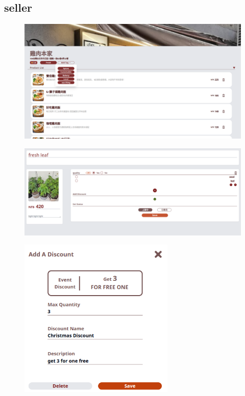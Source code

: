 \documentclass[a4paper, 12pt]{article}
\begin{document}
\subsection{seller}
\begin{figure}[hp]
    \centerline{\includegraphics[width=40em]{gui-snapshot/seller/store-edit.png}}
    \label{fig:enter-label}
\end{figure}
\newline
{}
\begin{figure}[hp]
    \centerline{\includegraphics[width=40em]{gui-snapshot/seller/item.png}}
    \label{fig:enter-label}
\end{figure}
\newpage
{}
\begin{figure}[hp]
    \centerline{\includegraphics[width=20em]{gui-snapshot/seller/discount.png}}
    \label{fig:enter-label}
\end{figure}
\end{document}
